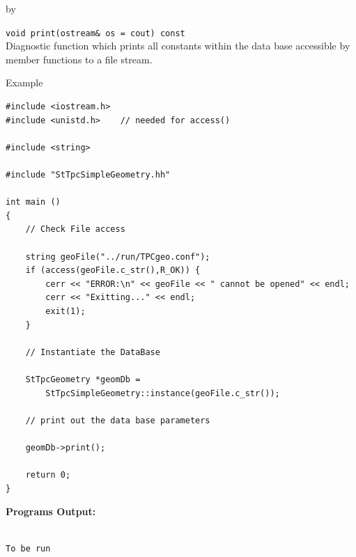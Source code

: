 \documentclass[twoside]{article}
\newcommand{\entrylabel}[1]{\mbox{\textbf{{#1}}}\hfil}%
\newenvironment{entry}
{\begin{list}{}%
    {\renewcommand{\makelabel}{\entrylabel}%
     \setlength{\labelwidth}{90pt}%
     \setlength{\leftmargin}{\labelwidth}
     \advance\leftmargin by \labelsep%
      }%
    }%
  {\end{list}}
\newcommand{\Entrylabel}[1]%
{\raisebox{0pt}[1ex][0pt]{\makebox[\labelwidth][l]%
    {\parbox[t]{\labelwidth}{\hspace{0pt}\textbf{{#1}}}}}}
\newenvironment{Entry}%
{\renewcommand{\entrylabel}{\Entrylabel}\begin{entry}}%
  {\end{entry}}
\begin{document}
\begin{Entry}
  \verb+void print(ostream& os = cout) const+\\
  Diagnostic function which prints all constants within
  the data base accessible by member functions to
  a file stream.  

\item[Example]

{\footnotesize
\begin{verbatim}
#include <iostream.h>
#include <unistd.h>    // needed for access()

#include <string>

#include "StTpcSimpleGeometry.hh"

int main ()
{
    // Check File access

    string geoFile("../run/TPCgeo.conf");
    if (access(geoFile.c_str(),R_OK)) {
        cerr << "ERROR:\n" << geoFile << " cannot be opened" << endl;
        cerr << "Exitting..." << endl;
        exit(1);
    }

    // Instantiate the DataBase

    StTpcGeometry *geomDb =
        StTpcSimpleGeometry::instance(geoFile.c_str());

    // print out the data base parameters

    geomDb->print();
    
    return 0;
}
\end{verbatim}
}%
{\bf Programs Output:}
{\footnotesize
\begin{verbatim}

To be run

\end{verbatim}
} %

\end{Entry}
\clearpage

%
%
\end{document}
